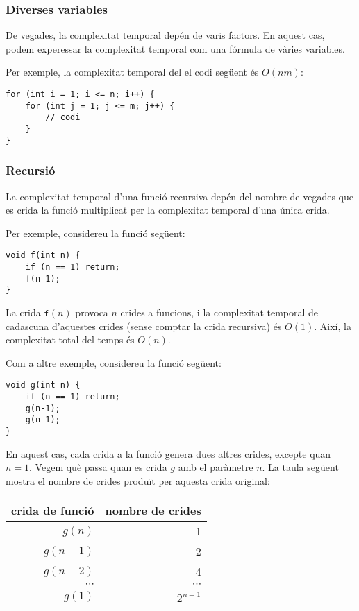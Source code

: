 \subsubsection*{Diverses variables}

De vegades, la complexitat temporal depén de
varis factors.
En aquest cas, podem experessar la complexitat temporal
com una fórmula de vàries variables.

Per exemple, la complexitat temporal del
el codi següent és $O(nm)$:

\begin{lstlisting}
for (int i = 1; i <= n; i++) {
    for (int j = 1; j <= m; j++) {
        // codi
    }
}
\end{lstlisting}

\subsubsection*{Recursió}

La complexitat temporal d'una funció recursiva depén
del nombre de vegades que es crida la funció
multiplicat per la complexitat temporal d'una única crida.

Per exemple, considereu la funció següent:
\begin{lstlisting}
void f(int n) {
    if (n == 1) return;
    f(n-1);
}
\end{lstlisting}
La crida $\texttt{f}(n)$ provoca $n$ crides a funcions,
i la complexitat temporal de cadascuna d'aquestes crides
(sense comptar la crida recursiva) és $O(1)$.
Així, la complexitat total del temps és $O(n)$.

Com a altre exemple, considereu la funció següent:
\begin{lstlisting}
void g(int n) {
    if (n == 1) return;
    g(n-1);
    g(n-1);
}
\end{lstlisting}
En aquest cas, cada crida a la funció genera dues altres
crides, excepte quan $n=1$.
Vegem què passa quan es crida $g$
amb el paràmetre $n$.
La taula següent mostra el nombre de crides
produït per aquesta crida original:

\begin{centre}
\begin{tabular}{rr}
crida de funció & nombre de crides \\
\hline
$g(n)$ & 1 \\
$g(n-1)$ & 2 \\
$g(n-2)$ & 4 \\
$\cdots$ & $\cdots$ \\
$g(1)$ & $2^{n-1}$ \\
\end{tabular}
\end{centre}

